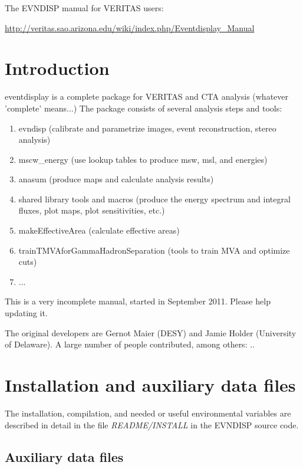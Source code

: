 \documentclass[titlepage,a4paper,twoside,11pt]{report}
\newcommand{\clearemptydoublepage}{\newpage{\pagestyle{empty}\cleardoublepage}}
\begin{document}
The EVNDISP manual for VERITAS users: 

\url{http://veritas.sao.arizona.edu/wiki/index.php/Eventdisplay\_Manual}

\clearemptydoublepage

\chapter{Introduction}

\noindent eventdisplay is a complete package for VERITAS and CTA analysis (whatever 'complete' means...)
The package consists of several analysis steps and tools:

\begin{enumerate}
\item evndisp (calibrate and parametrize images, event reconstruction, stereo analysis)
\item mscw\_energy (use lookup tables to produce msw, msl, and energies)
\item anasum (produce maps and calculate analysis results)
\item shared library tools and macros  (produce the energy spectrum and integral fluxes, plot maps, plot sensitivities, etc.) 
\item makeEffectiveArea (calculate effective areas)
\item trainTMVAforGammaHadronSeparation (tools to train MVA and optimize cuts)
\item ...
\end{enumerate}

This is a very incomplete manual, started in September 2011. Please help updating it.

The original developers are Gernot Maier (DESY) and Jamie Holder (University of Delaware). 
A large number of people contributed, among others: ..

%
%

\chapter{Installation and auxiliary data files}
\label{SECTION.ENVIRON}

The installation, compilation, and needed or useful environmental variables are described in detail in the file {\it README/INSTALL} in the EVNDISP source code.

\section{Auxiliary data files}
\label{SECTION.AUXFILE}
\end{document}
